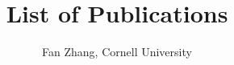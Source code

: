 \documentclass{article}
\begin{document}
\title{\bf List of Publications}
\author{Fan Zhang, Cornell University}
\date{}

\maketitle

\nocite{*}
\printbibliography[type=inproceedings,heading=none]
\end{document}
